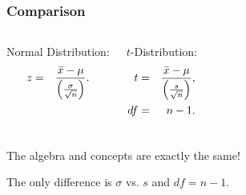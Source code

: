 \begin{frame}
  

\end{frame}


\begin{frame}
  \frametitle{Comparison}

  \begin{columns}
    Normal Distribution:
    \begin{eqnarray*}
      z &  = & \frac{\bar{x}-\mu}{\left( \frac{\sigma}{\sqrt{n}} \right)}.
    \end{eqnarray*}

    $t$-Distribution:
    \begin{eqnarray*}
      t &  = & \frac{\bar{x}-\mu}{\left( \frac{s}{\sqrt{n}} \right)}, \\
      df & = & n-1.
    \end{eqnarray*}

  \end{columns}

  \vfill

    {

      \begin{center}
        The algebra and concepts are exactly the same!

        The only difference is $\sigma$ vs. $s$ and $df=n-1$.
      \end{center}
    }

    \vfill
  

\end{frame}


